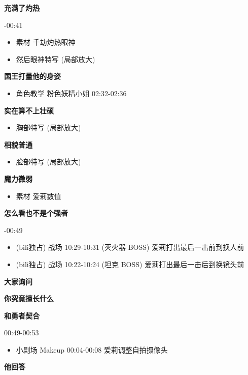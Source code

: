 \documentclass[a4paper]{article}
\begin{document}
\textbf{\color{red} 充满了灼热}

-00:41
 
\begin{itemize}
    \item 素材 千劫灼热眼神
    \item 然后眼神特写 (局部放大)
\end{itemize}

\textbf{国王打量他的身姿}

\begin{itemize}
    \item 角色教学 粉色妖精小姐 02:32-02:36
\end{itemize}

\textbf{实在算不上壮硕}

\begin{itemize}
    \item 胸部特写 (局部放大)
\end{itemize}

\textbf{相貌普通}

\begin{itemize}
    \item 脸部特写 (局部放大)
\end{itemize}

\textbf{魔力微弱}

\begin{itemize}
    \item 素材 爱莉数值
\end{itemize}

\textbf{怎么看也不是个强者}

-00:49

\begin{itemize}
    \item (bili独占) 战场 10:29-10:31 (灭火器 BOSS) 爱莉打出最后一击前到换人前
    \item (bili独占) 战场 10:22-10:24 (坦克 BOSS) 爱莉打出最后一击后到换镜头前
\end{itemize}

\textbf{大家询问}

\textbf{你究竟擅长什么}

\textbf{和勇者契合}

00:49-00:53

\begin{itemize}
    \item 小剧场 Makeup 00:04-00:08 爱莉调整自拍摄像头
\end{itemize}

\textbf{他回答}
\end{document}

